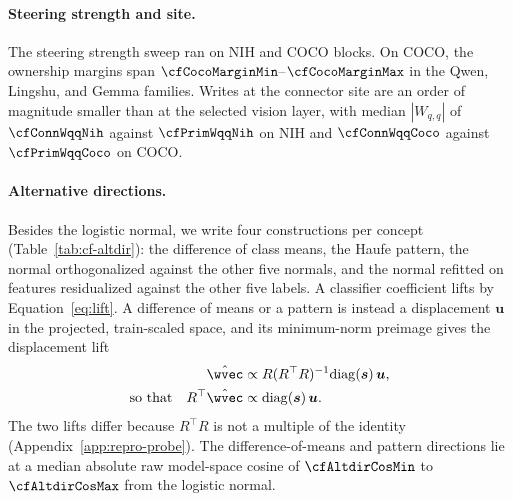 

\paragraph{Steering strength and site.} The steering strength sweep ran on \cfDoseBlocksNih{} NIH and \cfDoseBlocksCoco{} COCO blocks. On COCO, the ownership margins span $\cfCocoMarginMin$--$\cfCocoMarginMax$ in the Qwen, Lingshu, and Gemma families. Writes at the connector site are an order of magnitude smaller than at the selected vision layer, with median $|W_{q,q}|$ of $\cfConnWqqNih$ against $\cfPrimWqqNih$ on NIH and $\cfConnWqqCoco$ against $\cfPrimWqqCoco$ on COCO.

\paragraph{Alternative directions.} Besides the logistic normal, we write four constructions per concept (Table~\ref{tab:cf-altdir}): the difference of class means, the Haufe pattern, the normal orthogonalized against the other five normals, and the normal refitted on features residualized against the other five labels. A classifier coefficient lifts by Equation~\ref{eq:lift}. A difference of means or a pattern is instead a displacement $\boldsymbol u$ in the projected, train-scaled space, and its minimum-norm preimage gives the displacement lift
\begin{equation}
\begin{aligned}
\hat\wvec&\propto R(R^{\top}R)^{-1}\mathrm{diag}(\boldsymbol s)\,\boldsymbol u,\\
\text{so that}\quad R^{\top}\hat\wvec&\propto\mathrm{diag}(\boldsymbol s)\,\boldsymbol u .
\end{aligned}
\label{eq:displacement-lift}
\end{equation}
The two lifts differ because $R^{\top}R$ is not a multiple of the identity (Appendix~\ref{app:repro-probe}). The difference-of-means and pattern directions lie at a median absolute raw model-space cosine of $\cfAltdirCosMin$ to $\cfAltdirCosMax$ from the logistic normal.

